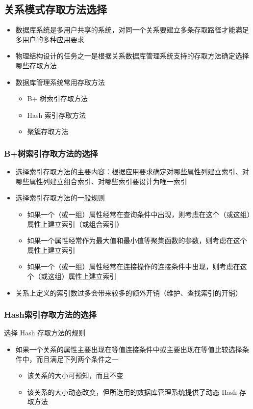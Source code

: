 \subsection{关系模式存取方法选择}
\begin{itemize}
    \item 数据库系统是多用户共享的系统，对同一个关系要建立多条存取路径才能满足多用户的多种应用要求
    \item 物理结构设计的任务之一是根据关系数据库管理系统支持的存取方法确定选择哪些存取方法
    \item 数据库管理系统常用存取方法
    \vspace{-0.8em}
    \begin{multicols}{3}
        \begin{itemize}
            \item B+ 树索引存取方法
            \item Hash 索引存取方法
            \item 聚簇存取方法
        \end{itemize}
    \end{multicols}
    \vspace{-1em}
\end{itemize}

\subsubsection{B+树索引存取方法的选择}
\begin{itemize}
    \item 选择索引存取方法的主要内容：根据应用要求确定对哪些属性列建立索引、对哪些属性列建立组合索引、对哪些索引要设计为唯一索引
    \item 选择索引存取方法的一般规则
    \begin{itemize}
        \item 如果一个（或一组）属性经常在查询条件中出现，则考虑在这个（或这组）属性上建立索引（或组合索引）
        \item 如果一个属性经常作为最大值和最小值等聚集函数的参数，则考虑在这个属性上建立索引
        \item 如果一个（或一组）属性经常在连接操作的连接条件中出现，则考虑在这个（或这组）属性上建立索引
    \end{itemize}
    \item 关系上定义的索引数过多会带来较多的额外开销（维护、查找索引的开销）
\end{itemize}

\subsubsection{Hash索引存取方法的选择}
选择 Hash 存取方法的规则
\begin{itemize}
    \item 如果一个关系的属性主要出现在等值连接条件中或主要出现在等值比较选择条件中，而且满足下列两个条件之一
    \begin{itemize}
        \item 该关系的大小可预知，而且不变
        \item 该关系的大小动态改变，但所选用的数据库管理系统提供了动态 Hash 存取方法
    \end{itemize}
\end{itemize}

